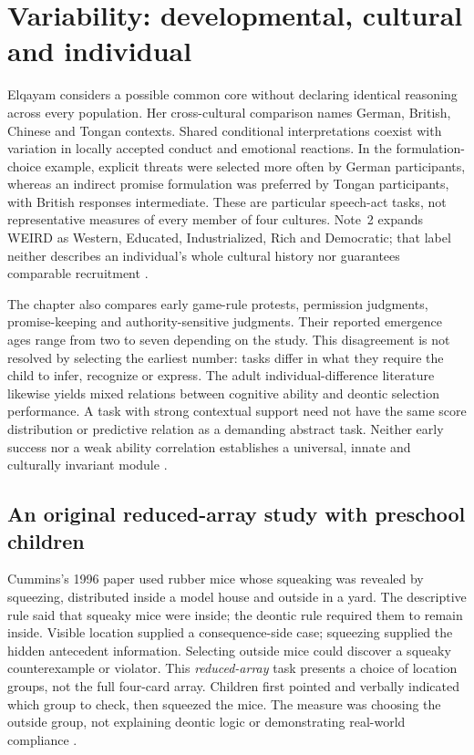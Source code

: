 \section{Variability: developmental, cultural and individual}
\label{sec:p19-r112-variability}

Elqayam considers a possible common core without declaring identical reasoning
across every population. Her cross-cultural comparison names German, British,
Chinese and Tongan contexts. Shared conditional interpretations coexist with
variation in locally accepted conduct and emotional reactions. In the
formulation-choice example, explicit threats were selected more often by
German participants, whereas an indirect promise formulation was preferred
by Tongan participants, with British responses intermediate. These are
particular speech-act tasks, not representative measures of every member of
four cultures. Note~2 expands WEIRD as Western, Educated, Industrialized,
Rich and Democratic; that label neither describes an individual's whole
cultural history nor guarantees comparable recruitment
\cite[pp.~653--655, note~2]{Elqayam2021DeonticPsychology}.

The chapter also compares early game-rule protests, permission judgments,
promise-keeping and authority-sensitive judgments. Their reported emergence
ages range from two to seven depending on the study. This disagreement is not
resolved by selecting the earliest number: tasks differ in what they require
the child to infer, recognize or express. The adult individual-difference
literature likewise yields mixed relations between cognitive ability and
deontic selection performance. A task with strong contextual support need not
have the same score distribution or predictive relation as a demanding abstract
task. Neither early success nor a weak ability correlation establishes a
universal, innate and culturally invariant module
\cite[p.~654]{Elqayam2021DeonticPsychology}.

\subsection{An original reduced-array study with preschool children}
\label{sec:p19-r112-cummins}

Cummins's 1996 paper used rubber mice whose squeaking was revealed by
squeezing, distributed inside a model house and outside in a yard. The
descriptive rule said that squeaky mice were inside; the deontic rule required
them to remain inside. Visible location supplied a consequence-side case;
squeezing supplied the hidden antecedent information. Selecting outside mice
could discover a squeaky counterexample or violator. This \emph{reduced-array}
task presents a choice of location groups, not the full four-card array.
Children first pointed and verbally indicated which group to check, then
squeezed the mice. The measure was choosing the outside group, not explaining
deontic logic or demonstrating real-world compliance
\cite[pp.~824--826]{Cummins1996PreschoolDeontic}.

